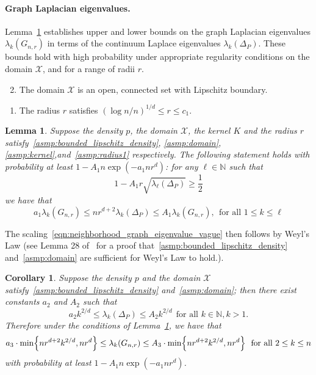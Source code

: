 \documentclass[twoside]{article}
\newcommand{\1}{\mathbf{1}}
\newcommand{\Xset}{\mathcal{X}}
\newtheorem{lemma}{Lemma}
\newtheorem{corollary}{Corollary}
\theoremstyle{definition}
\theoremstyle{remark}
\begin{document}
\paragraph{Graph Laplacian eigenvalues.} Lemma~\ref{lem:neighborhood_eigenvalue} establishes upper and lower bounds on the graph Laplacian eigenvalues $\lambda_{k}(G_{n,r})$ in terms of the continuum Laplace eigenvalues $\lambda_k(\Delta_P)$. These bounds hold with high probability under appropriate regularity conditions on the domain $\Xset$, and for a range of radii $r$.
\begin{enumerate}[label=(P\arabic*)]
	\setcounter{enumi}{1}
	\item
	\label{asmp:domain}
	The domain $\Xset$ is an open, connected set with Lipschitz boundary.
\end{enumerate}
\begin{enumerate}[label=(R\arabic*)]
	\item
	\label{asmp:radius1}
	The radius $r$ satisfies $(\log n/n)^{1/d} \leq r \leq c_1$.
\end{enumerate}
\begin{lemma}
	\label{lem:neighborhood_eigenvalue}
	Suppose the density $p$, the domain $\Xset$, the kernel $K$ and the radius $r$ satisfy~\ref{asmp:bounded_lipschitz_density}, \ref{asmp:domain}, \ref{asmp:kernel},and~\ref{asmp:radius1} respectively. The following statement holds with probability at least $1 - A_1n\exp(-a_1nr^{d})$: for any $\ell \in \mathbb{N}$ such that
	\begin{equation}
	\label{eqn:neighborhood_eigenvalue_1}
	1 - A_1 r \sqrt{\lambda_{\ell}(\Delta_P)} \geq \frac{1}{2}
	\end{equation}
	we have that
	\begin{equation}
	\label{eqn:eigenvalue_bound}
	a_1 \lambda_k(G_{n,r}) \leq nr^{d+2} \lambda_k(\Delta_P) \leq A_1 \lambda_k(G_{n,r}),~~\textrm{for all $1 \leq k \leq \ell$}
	\end{equation}
\end{lemma}

The scaling~\eqref{eqn:neighborhood_graph_eigenvalue_vague} then follows by Weyl's Law (see Lemma 28 of~\citep{dunlop2020} for a proof that~\ref{asmp:bounded_lipschitz_density} and~\ref{asmp:domain} are sufficient for Weyl's Law to hold.).
\begin{corollary}
	\label{cor:neighborhood_eigenvalue}
	Suppose the density $p$ and the domain $\Xset$ satisfy~\ref{asmp:bounded_lipschitz_density} and~\ref{asmp:domain}; then there exist constants $a_2$ and $A_2$ such that
	\begin{equation}
	\label{eqn:weyls_law}
	a_2k^{2/d} \leq \lambda_k(\Delta_P) \leq A_2k^{2/d}~~\textrm{for all $k \in \mathbb{N}, k > 1$}.
	\end{equation}
	Therefore under the conditions of Lemma~\ref{lem:neighborhood_eigenvalue}, we have that
	\begin{equation}
	\label{eqn:neighborhood_eigenvalue_2}
	a_3 \cdot \min\Bigl\{nr^{d + 2}k^{2/d},nr^d\Bigr\} \leq \lambda_k(G_{n,r}) \leq A_3 \cdot \min\Bigl\{nr^{d + 2}k^{2/d}, nr^d\Bigr\}~~\textrm{for all $2 \leq k \leq n$}
	\end{equation}
	with probability at least $1 - A_1n\exp(-a_1nr^d)$.
\end{corollary}
\end{document}

